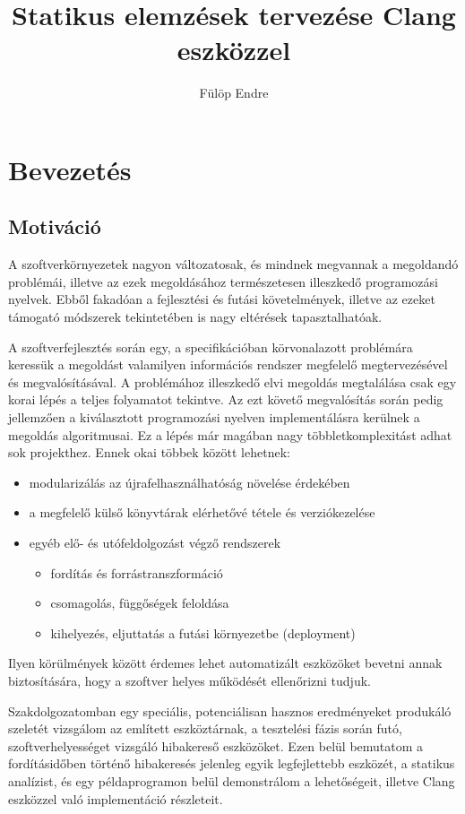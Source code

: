\documentclass[a4paper,12pt]{report}
\title{Statikus elemzések tervezése Clang eszközzel}
\author{Fülöp Endre}
\begin{document}


\tableofcontents

\chapter{Bevezetés}
\section{Motiváció}
A szoftverkörnyezetek nagyon változatosak, és mindnek megvannak a megoldandó problémái, illetve az ezek megoldásához természetesen illeszkedő programozási nyelvek. Ebből fakadóan a fejlesztési és futási követelmények, illetve az ezeket támogató módszerek tekintetében is nagy eltérések tapasztalhatóak.

A szoftverfejlesztés során egy, a specifikációban körvonalazott problémára keressük a megoldást valamilyen információs rendszer megfelelő megtervezésével és megvalósításával. A problémához illeszkedő elvi megoldás megtalálása csak egy korai lépés a teljes folyamatot tekintve. Az ezt követő megvalósítás során pedig jellemzően a kiválasztott programozási nyelven implementálásra kerülnek a megoldás algoritmusai. Ez a lépés már magában nagy többletkomplexitást adhat sok projekthez. Ennek okai többek között lehetnek:
\begin{itemize}
\item modularizálás az újrafelhasználhatóság növelése érdekében
\item a megfelelő külső könyvtárak elérhetővé tétele és verziókezelése
\item egyéb elő- és utófeldolgozást végző rendszerek
\begin{itemize}
\item fordítás és forrástranszformáció
\item csomagolás, függőségek feloldása
\item kihelyezés, eljuttatás a futási környezetbe (deployment)
\end{itemize}
\end{itemize}
Ilyen körülmények között érdemes lehet automatizált eszközöket bevetni annak biztosítására, hogy a szoftver helyes működését ellenőrizni tudjuk.

Szakdolgozatomban egy speciális, potenciálisan hasznos eredményeket produkáló szeletét vizsgálom az említett eszköztárnak, a tesztelési fázis során futó, szoftverhelyességet vizsgáló hibakereső eszközöket. Ezen belül bemutatom a fordításidőben történő hibakeresés jelenleg egyik legfejlettebb eszközét, a statikus analízist, és egy példaprogramon belül demonstrálom a lehetőségeit, illetve Clang eszközzel való implementáció részleteit.
\end{document}
